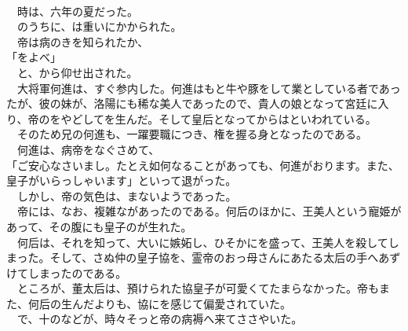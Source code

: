 \documentclass[
  paper=a5,
  fontsize=10pt,
  jafontsize=9.5pt,
  tate,                  %
  open_bracket_pos=nibu, %
]{jlreq}
\begin{document}
\\


　時は、六年の夏だった。\\


　のうちに、は重いにかかられた。\\


　帝は病のきを知られたか、\\


「をよべ」\\


　と、から仰せ出された。\\


　大将軍何進は、すぐ参内した。何進はもと牛や豚をして業としている者であったが、彼の妹が、洛陽にも稀な美人であったので、貴人の娘となって宮廷に入り、帝のをやどしてを生んだ。そして皇后となってからはといわれている。\\


　そのため兄の何進も、一躍要職につき、権を握る身となったのである。\\


　何進は、病帝をなぐさめて、\\


「ご安心なさいまし。たとえ如何なることがあっても、何進がおります。また、皇子がいらっしゃいます」といって退がった。\\


　しかし、帝の気色は、まないようであった。\\


　帝には、なお、複雑ながあったのである。何后のほかに、王美人という寵姫があって、その腹にも皇子のが生れた。\\


　何后は、それを知って、大いに嫉妬し、ひそかにを盛って、王美人を殺してしまった。そして、さぬ仲の皇子協を、霊帝のおっ母さんにあたる太后の手へあずけてしまったのである。\\


　ところが、董太后は、預けられた協皇子が可愛くてたまらなかった。帝もまた、何后の生んだよりも、協にを感じて偏愛されていた。\\


　で、十のなどが、時々そっと帝の病褥へ来てささやいた。\\
\end{document}

